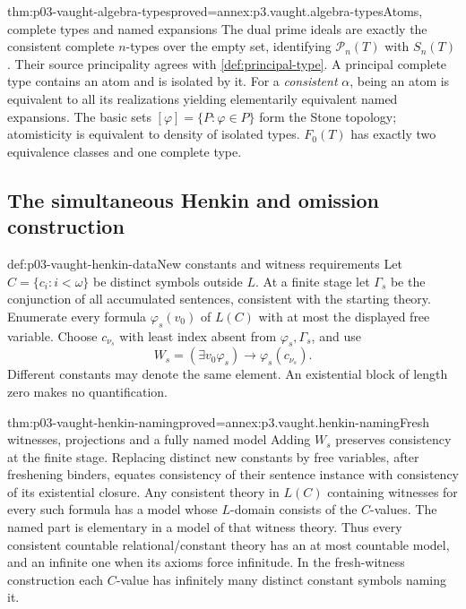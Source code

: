 \begin{hblemma}{thm:p03-vaught-algebra-types}{proved=annex:p3.vaught.algebra-types}{Atoms, complete types and named expansions}
The dual prime ideals are exactly the consistent complete \(n\)-types
over the empty set, identifying \(\mathcal P_n(T)\) with \(S_n(T)\).
Their source principality agrees with \cref{def:principal-type}.
A principal complete type contains an atom and is isolated by it.
For a \emph{consistent} \(\alpha\), being an atom is equivalent to all
its realizations yielding elementarily equivalent named expansions.
The basic sets \([\varphi]=\{P:\varphi\in P\}\) form the Stone topology;
atomisticity is equivalent to density of isolated types.
\(F_0(T)\) has exactly two equivalence classes and one complete type.
\end{hblemma}

\subsection{The simultaneous Henkin and omission construction}
\label{sec:p03-vaught-simultaneous}

\begin{hbdefinition}{def:p03-vaught-henkin-data}{New constants and witness requirements}
Let \(C=\{c_i:i<\omega\}\) be distinct symbols outside \(L\).
At a finite stage let \(\Gamma_s\) be the conjunction of all accumulated
sentences, consistent with the starting theory.
Enumerate every formula \(\varphi_s(v_0)\) of \(L(C)\) with at most
the displayed free variable. Choose \(c_{\nu_s}\) with least index
absent from \(\varphi_s,\Gamma_s\), and use
\[
 W_s=(\exists v_0\varphi_s)\to\varphi_s(c_{\nu_s}).
\]
Different constants may denote the same element.
An existential block of length zero makes no quantification.
\end{hbdefinition}

\begin{hblemma}{thm:p03-vaught-henkin-naming}{proved=annex:p3.vaught.henkin-naming}{Fresh witnesses, projections and a fully named model}
Adding \(W_s\) preserves consistency at the finite stage.
Replacing distinct new constants by free variables, after freshening
binders, equates consistency of their sentence instance with consistency
of its existential closure.
Any consistent theory in \(L(C)\) containing witnesses for every such
formula has a model whose \(L\)-domain consists of the \(C\)-values.
The named part is elementary in a model of that witness theory.
Thus every consistent countable relational/constant theory has an
at most countable model, and an infinite one when its axioms force
infinitude.
In the fresh-witness construction each \(C\)-value has infinitely
many distinct constant symbols naming it.
\end{hblemma}

